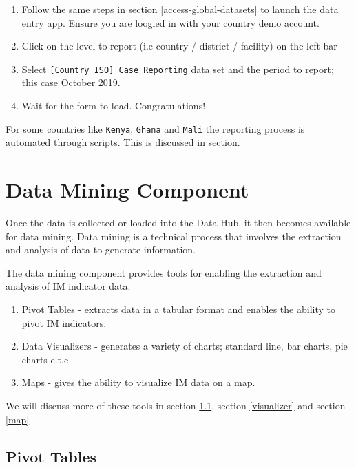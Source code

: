 \documentclass[]{book}
\providecommand{\tightlist}{%
  \setlength{\itemsep}{0pt}\setlength{\parskip}{0pt}}
\begin{document}
\begin{enumerate}
\def\labelenumi{\arabic{enumi}.}
\item
  Follow the same steps in section \ref{access-global-datasets} to launch the data entry app. Ensure you are loogied in with your country demo account.
\item
  Click on the level to report (i.e country / district / facility) on the left bar
\item
  Select \texttt{{[}Country\ ISO{]}\ Case\ Reporting} data set and the period to report; this case October 2019.
\item
  Wait for the form to load. Congratulations!
\end{enumerate}

For some countries like \texttt{Kenya}, \texttt{Ghana} and \texttt{Mali} the reporting process is automated through scripts. This is discussed in section.

\hypertarget{data-mining-component}{%
\section{Data Mining Component}\label{data-mining-component}}

Once the data is collected or loaded into the Data Hub, it then becomes available for data mining. Data mining is a technical process that involves the extraction and analysis of data to generate information.

The data mining component provides tools for enabling the extraction and analysis of IM indicator data.

\begin{enumerate}
\def\labelenumi{\arabic{enumi}.}
\tightlist
\item
  Pivot Tables - extracts data in a tabular format and enables the ability to pivot IM indicators.
\item
  Data Visualizers - generates a variety of charts; standard line, bar charts, pie charts e.t.c
\item
  Maps - gives the ability to visualize IM data on a map.
\end{enumerate}

We will discuss more of these tools in section \ref{pivot}, section \ref{visualizer} and section \ref{map}

\hypertarget{pivot}{%
\subsection{Pivot Tables}\label{pivot}}
\end{document}
